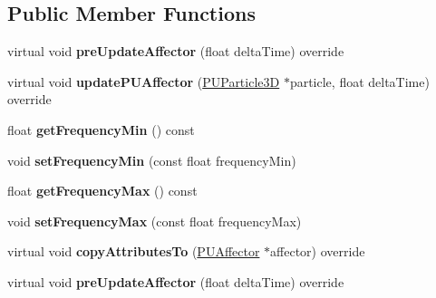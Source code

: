 \subsection*{Public Member Functions}
\begin{DoxyCompactItemize}
\item 
\mbox{\label{classPUSineForceAffector_ac2460cfc70d433cc65e405e937bd47bf}} 
virtual void {\bfseries pre\+Update\+Affector} (float delta\+Time) override
\item 
\mbox{\label{classPUSineForceAffector_a9183d8228a1bbf21526741351a817ab0}} 
virtual void {\bfseries update\+P\+U\+Affector} (\hyperlink{structPUParticle3D}{P\+U\+Particle3D} $\ast$particle, float delta\+Time) override
\item 
\mbox{\label{classPUSineForceAffector_a151136062df4d5209de0b9c5aa7cd13b}} 
float {\bfseries get\+Frequency\+Min} () const
\item 
\mbox{\label{classPUSineForceAffector_abd4e5e8de6e3c36176c86b843b38fa5d}} 
void {\bfseries set\+Frequency\+Min} (const float frequency\+Min)
\item 
\mbox{\label{classPUSineForceAffector_ae1c888502fa30aeed1c5f08769c48220}} 
float {\bfseries get\+Frequency\+Max} () const
\item 
\mbox{\label{classPUSineForceAffector_a5cde261c1733c4e1ead208b1e72ee668}} 
void {\bfseries set\+Frequency\+Max} (const float frequency\+Max)
\item 
\mbox{\label{classPUSineForceAffector_a1694ad3de106b96fd0527998a235742e}} 
virtual void {\bfseries copy\+Attributes\+To} (\hyperlink{classPUAffector}{P\+U\+Affector} $\ast$affector) override
\item 
\mbox{\label{classPUSineForceAffector_a606458d1c1ec051c7a03edea29ef37de}} 
virtual void {\bfseries pre\+Update\+Affector} (float delta\+Time) override
\item 
\mbox{\label{classPUSineForceAffector_a1aad0a208281fe27ddb7ee23bdc6b6e6}} 

\end{DoxyCompactItemize}
